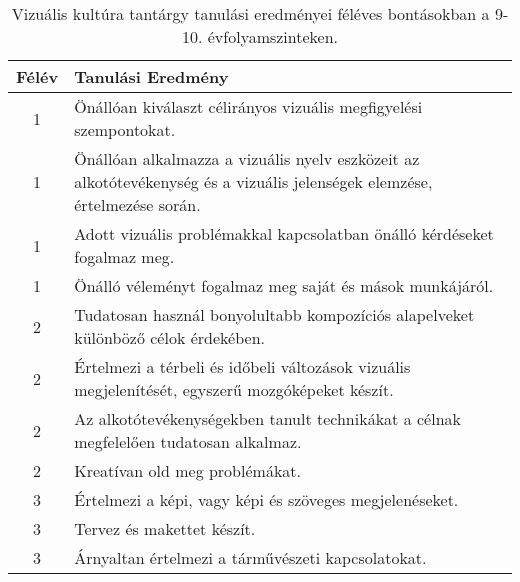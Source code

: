       
           \begin{longtable}{c | p{} }
            \caption[Vizuális kultúra 9-10.]{Vizuális kultúra tantárgy tanulási eredményei féléves bontásokban a 9-10. évfolyamszinteken. }  \\

            \textbf{Félév} & \textbf{Tanulási Eredmény} \\
            \hline
            \endhead
                                
                                          1 &  Önállóan kiválaszt célirányos vizuális megfigyelési szempontokat. \\ \hline
                                          1 &  Önállóan alkalmazza a vizuális nyelv eszközeit az alkotótevékenység és a vizuális jelenségek elemzése, értelmezése során. \\ \hline
                                          1 &  Adott vizuális problémakkal kapcsolatban önálló kérdéseket fogalmaz meg. \\ \hline
                                          1 &  Önálló véleményt fogalmaz meg saját és mások munkájáról. \\ \hline
                                      
                                
                                          2 &  Tudatosan használ bonyolultabb kompozíciós alapelveket különböző célok érdekében. \\ \hline
                                          2 &  Értelmezi a térbeli és időbeli változások vizuális megjelenítését, egyszerű mozgóképeket készít. \\ \hline
                                          2 &  Az alkotótevékenységekben tanult technikákat a célnak megfelelően tudatosan alkalmaz. \\ \hline
                                          2 &  Kreatívan old meg problémákat. \\ \hline
                                      
                                
                                          3 &  Értelmezi a képi, vagy képi és szöveges megjelenéseket. \\ \hline
                                          3 &  Tervez és makettet készít. \\ \hline
                                          3 &  Árnyaltan értelmezi a tárművészeti kapcsolatokat. \\ \hline
                                      

\end{longtable}

